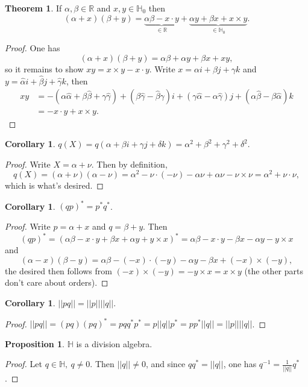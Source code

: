 \documentclass[a4paper]{article}
\newcommand{\R}{\mathbb{R}}
\newcommand{\Hq}{\mathbb{H}}
\theoremstyle{definition}
\newtheorem{prop}[defn]{Proposition}
\newtheorem{thm}[defn]{Theorem}
\newtheorem{coro}[defn]{Corollary}
\begin{document}
\begin{thm}
If $\alpha,\beta\in\R$ and $x,y\in\Hq_0$ then
\[
(\alpha+x)(\beta+y)=\underbrace{\alpha\beta-x\cdot y}_{\in\R}+\underbrace{\alpha y+\beta x+x\times y}_{\in\Hq_0}.
\]
\end{thm}
\begin{proof}
One has
\[
(\alpha+x)(\beta+y)=\alpha\beta+\alpha y+\beta x+xy,
\]
so it remains to show $xy=x\times y-x\cdot y$. Write $x=\alpha i+\beta j+\gamma k$ and $y=\widehat\alpha i+\widehat\beta j+\widehat\gamma k$, then
\[
\begin{aligned}
xy&=-(\alpha\widehat\alpha+\beta\widehat\beta+\gamma\widehat\gamma)+(\beta\widehat\gamma-\widehat\beta\gamma)i+(\gamma\widehat\alpha-\alpha\widehat\gamma)j+(\alpha\widehat\beta-\beta\widehat\alpha)k\\&=-x\cdot y+x\times y.
\end{aligned}
\]
\end{proof}

\begin{coro}
$q(X)=q(\alpha+\beta i+\gamma j+\delta k)=\alpha^2+\beta^2+\gamma^2+\delta^2$.
\end{coro}
\begin{proof}
Write $X=\alpha+\nu$. Then by definition,
\[
q(X)=(\alpha+\nu)(\alpha-\nu)=\alpha^2-\nu\cdot(-\nu)-\alpha\nu+\alpha\nu-\nu\times\nu=\alpha^2+\nu\cdot\nu,
\]
which is what's desired.
\end{proof}

\begin{coro}
$(qp)^\ast=p^\ast q^\ast$.
\end{coro}
\begin{proof}
Write $p=\alpha+x$ and $q=\beta+y$. Then
\[
(qp)^\ast=(\alpha\beta-x\cdot y+\beta x+\alpha y+y\times x)^\ast=\alpha\beta-x\cdot y-\beta x-\alpha y-y\times x
\]
and
\[
(\alpha-x)(\beta-y)=\alpha\beta-(-x)\cdot (-y)-\alpha y-\beta x +(-x)\times (-y),
\]
the desired then follows from $(-x)\times (-y)=-y\times x=x\times y$ (the other parts don't care about orders).
\end{proof}

\begin{coro}
$||pq||=||p||||q||$.
\end{coro}
\begin{proof}
$||pq||=(pq)(pq)^\ast=pqq^\ast p^\ast=p||q||p^\ast=pp^\ast||q||=||p||||q||$.
\end{proof}

\begin{prop}
$\Hq$ is a division algebra.
\end{prop}
\begin{proof}
Let $q\in\Hq,\ q\neq 0$. Then $||q||\neq 0$, and since $qq^\ast=||q||$, one has $q^{-1}=\frac{1}{||q||}q^\ast$.
\end{proof}
\end{document}
